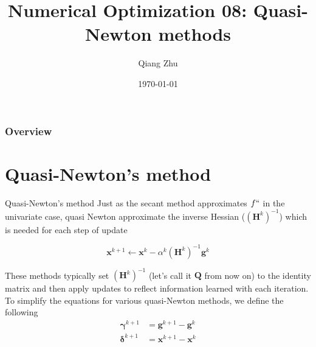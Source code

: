 \documentclass{beamer}
\title[Gradient Descent]{Numerical Optimization 08: Quasi-Newton methods} %
\author{Qiang Zhu} %
\institute[University of Nevada Las Vegas] %
{
University of Nevada Las Vegas\\ %
\medskip
}
\date{\today} %
\begin{document}
\begin{frame}
\titlepage %
\end{frame}

\begin{frame}
\frametitle{Overview} %
\tableofcontents %
\end{frame}



\section{Quasi-Newton's method}
\begin{frame}{Quasi-Newton's method}
Just as the secant method approximates $f``$ in the univariate case, quasi Newton approximate the inverse Hessian ($(\boldsymbol{H}^k)^{-1}$) which is needed for each step of update

\begin{equation*}
    \boldsymbol{x}^{k+1} \leftarrow \boldsymbol{x}^k - \alpha^k (\boldsymbol{H}^k)^{-1}\boldsymbol{g}^k
\end{equation*}

These methods typically set $(\boldsymbol{H}^k)^{-1}$ (let's call it $\boldsymbol{Q}$ from now on) to the identity matrix and then apply updates to reflect information learned with each iteration. To simplify the equations for various quasi-Newton methods, we define the following
\begin{equation*}
    \begin{split}
        \boldsymbol{\gamma}^{k+1} &= \boldsymbol{g}^{k+1} - \boldsymbol{g}^k\\
        \boldsymbol{\delta}^{k+1} &= \boldsymbol{x}^{k+1} - \boldsymbol{x}^k\\
    \end{split}
\end{equation*}


\end{frame}
\end{document}

